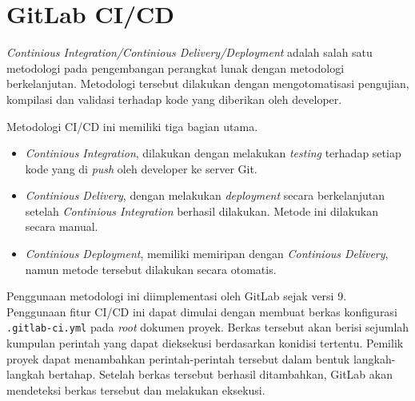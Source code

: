 \section{GitLab CI/CD}

    \textit{Continious Integration/Continious Delivery/Deployment} adalah salah satu metodologi pada pengembangan perangkat lunak dengan metodologi berkelanjutan. Metodologi tersebut dilakukan dengan mengotomatisasi pengujian, kompilasi dan validasi terhadap kode yang diberikan oleh developer\cite{gitlab-cicd:methodologies}.
    
    Metodologi CI/CD ini memiliki tiga bagian utama\cite{gitlab-cicd:methodologies}.
    \begin{itemize}
        \item \textit{Continious Integration}, dilakukan dengan melakukan \textit{testing} terhadap setiap kode yang di \textit{push} oleh developer ke server Git.
        
        \item \textit{Continious Delivery}, dengan melakukan \textit{deployment} secara berkelanjutan setelah \textit{Continious Integration} berhasil dilakukan. Metode ini dilakukan secara manual.
        
        \item \textit{Continious Deployment}, memiliki memiripan dengan \textit{Continious Delivery}, namun metode tersebut dilakukan secara otomatis.
    \end{itemize}
    
    Penggunaan metodologi ini diimplementasi oleh GitLab sejak versi 9\cite{gitlab-cicd:introduction}.  Penggunaan fitur CI/CD ini dapat dimulai dengan membuat berkas konfigurasi \texttt{.gitlab-ci.yml} pada \textit{root} dokumen proyek. Berkas tersebut akan berisi sejumlah kumpulan perintah yang dapat dieksekusi berdasarkan konidisi tertentu. Pemilik proyek dapat menambahkan perintah-perintah tersebut dalam bentuk langkah-langkah bertahap. Setelah berkas tersebut berhasil ditambahkan, GitLab akan mendeteksi berkas tersebut dan melakukan eksekusi.
    
